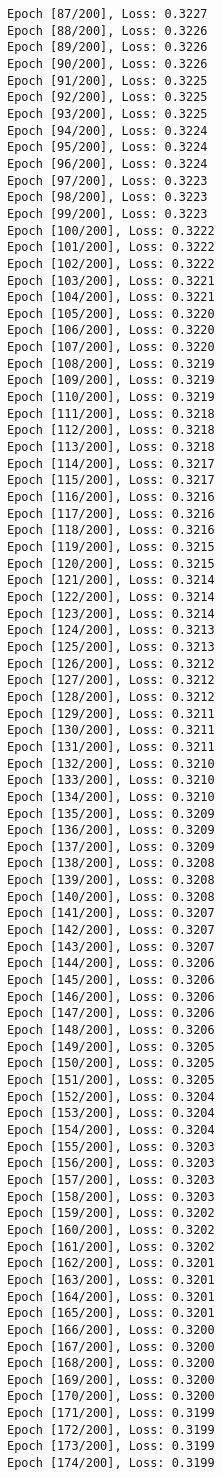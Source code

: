 \documentclass[11pt]{article}
\begin{document}
\begin{Verbatim}[commandchars=\\\{\}]
Epoch [87/200], Loss: 0.3227
Epoch [88/200], Loss: 0.3226
Epoch [89/200], Loss: 0.3226
Epoch [90/200], Loss: 0.3226
Epoch [91/200], Loss: 0.3225
Epoch [92/200], Loss: 0.3225
Epoch [93/200], Loss: 0.3225
Epoch [94/200], Loss: 0.3224
Epoch [95/200], Loss: 0.3224
Epoch [96/200], Loss: 0.3224
Epoch [97/200], Loss: 0.3223
Epoch [98/200], Loss: 0.3223
Epoch [99/200], Loss: 0.3223
Epoch [100/200], Loss: 0.3222
Epoch [101/200], Loss: 0.3222
Epoch [102/200], Loss: 0.3222
Epoch [103/200], Loss: 0.3221
Epoch [104/200], Loss: 0.3221
Epoch [105/200], Loss: 0.3220
Epoch [106/200], Loss: 0.3220
Epoch [107/200], Loss: 0.3220
Epoch [108/200], Loss: 0.3219
Epoch [109/200], Loss: 0.3219
Epoch [110/200], Loss: 0.3219
Epoch [111/200], Loss: 0.3218
Epoch [112/200], Loss: 0.3218
Epoch [113/200], Loss: 0.3218
Epoch [114/200], Loss: 0.3217
Epoch [115/200], Loss: 0.3217
Epoch [116/200], Loss: 0.3216
Epoch [117/200], Loss: 0.3216
Epoch [118/200], Loss: 0.3216
Epoch [119/200], Loss: 0.3215
Epoch [120/200], Loss: 0.3215
Epoch [121/200], Loss: 0.3214
Epoch [122/200], Loss: 0.3214
Epoch [123/200], Loss: 0.3214
Epoch [124/200], Loss: 0.3213
Epoch [125/200], Loss: 0.3213
Epoch [126/200], Loss: 0.3212
Epoch [127/200], Loss: 0.3212
Epoch [128/200], Loss: 0.3212
Epoch [129/200], Loss: 0.3211
Epoch [130/200], Loss: 0.3211
Epoch [131/200], Loss: 0.3211
Epoch [132/200], Loss: 0.3210
Epoch [133/200], Loss: 0.3210
Epoch [134/200], Loss: 0.3210
Epoch [135/200], Loss: 0.3209
Epoch [136/200], Loss: 0.3209
Epoch [137/200], Loss: 0.3209
Epoch [138/200], Loss: 0.3208
Epoch [139/200], Loss: 0.3208
Epoch [140/200], Loss: 0.3208
Epoch [141/200], Loss: 0.3207
Epoch [142/200], Loss: 0.3207
Epoch [143/200], Loss: 0.3207
Epoch [144/200], Loss: 0.3206
Epoch [145/200], Loss: 0.3206
Epoch [146/200], Loss: 0.3206
Epoch [147/200], Loss: 0.3206
Epoch [148/200], Loss: 0.3206
Epoch [149/200], Loss: 0.3205
Epoch [150/200], Loss: 0.3205
Epoch [151/200], Loss: 0.3205
Epoch [152/200], Loss: 0.3204
Epoch [153/200], Loss: 0.3204
Epoch [154/200], Loss: 0.3204
Epoch [155/200], Loss: 0.3203
Epoch [156/200], Loss: 0.3203
Epoch [157/200], Loss: 0.3203
Epoch [158/200], Loss: 0.3203
Epoch [159/200], Loss: 0.3202
Epoch [160/200], Loss: 0.3202
Epoch [161/200], Loss: 0.3202
Epoch [162/200], Loss: 0.3201
Epoch [163/200], Loss: 0.3201
Epoch [164/200], Loss: 0.3201
Epoch [165/200], Loss: 0.3201
Epoch [166/200], Loss: 0.3200
Epoch [167/200], Loss: 0.3200
Epoch [168/200], Loss: 0.3200
Epoch [169/200], Loss: 0.3200
Epoch [170/200], Loss: 0.3200
Epoch [171/200], Loss: 0.3199
Epoch [172/200], Loss: 0.3199
Epoch [173/200], Loss: 0.3199
Epoch [174/200], Loss: 0.3199

\end{Verbatim}
\end{document}
